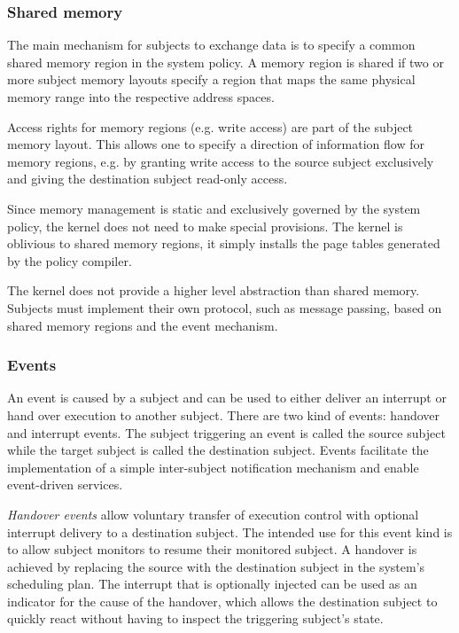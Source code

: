 \subsubsection{Shared memory}
The main mechanism for subjects to exchange data is to specify a common shared
memory region in the system policy. A memory region is shared if two or more
subject memory layouts specify a region that maps the same physical memory range
into the respective address spaces.

Access rights for memory regions (e.g. write access) are part of the subject
memory layout. This allows one to specify a direction of information flow for
memory regions, e.g. by granting write access to the source subject exclusively
and giving the destination subject read-only access.

Since memory management is static and exclusively governed by the system policy,
the kernel does not need to make special provisions. The kernel is oblivious to
shared memory regions, it simply installs the page tables generated by the
policy compiler.

The kernel does not provide a higher level abstraction than shared memory.
Subjects must implement their own protocol, such as message passing, based on
shared memory regions and the event mechanism.

\subsubsection{Events}\label{subsubsec:events}
An event is caused by a subject and can be used to either deliver an interrupt
or hand over execution to another subject. There are two kind of events:
handover and interrupt events. The subject triggering an event is called the
source subject while the target subject is called the destination subject.
Events facilitate the implementation of a simple inter-subject notification
mechanism and enable event-driven services.

\emph{Handover events} allow voluntary transfer of execution control with
optional interrupt delivery to a destination subject. The intended use for this
event kind is to allow subject monitors to resume their monitored subject. A
handover is achieved by replacing the source with the destination subject in the
system's scheduling plan. The interrupt that is optionally injected can be used
as an indicator for the cause of the handover, which allows the destination
subject to quickly react without having to inspect the triggering subject's
state.

